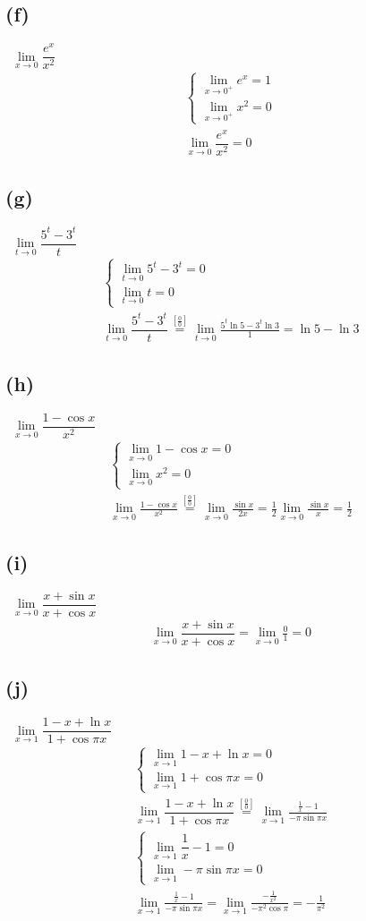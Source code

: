 \documentclass[12pt]{article}
\newcommand{\overfrac}[1]{\overset{[\frac{#1}{#1}]}{=}}
\newcommand{\subproblem}[1]{\subsection{(#1)} \,}
\begin{document}
\subproblem{f}
$\lim\limits_{x\to 0}\dfrac{e^x}{x^2}$
\begin{gather*}
    \begin{cases}
        \lim\limits_{x\to 0^+}e^x=1\\
        \lim\limits_{x\to 0^+}x^2=0
    \end{cases}\\
    \lim\limits_{x\to 0}\dfrac{e^x}{x^2}=\boxed{0}
\end{gather*}

\subproblem{g}
$\lim\limits_{t\to 0}\dfrac{5^t-3^t}{t}$
\begin{gather*}
    \begin{cases}
        \lim\limits_{t\to 0} 5^t-3^t=0\\
        \lim\limits_{t\to 0}t=0
    \end{cases}\\
    \lim\limits_{t\to 0}\dfrac{5^t-3^t}{t} \overset{[\frac{0}{0}]}{=}\lim\limits_{t\to 0}\frac{5^t\ln 5-3^t \ln 3}{1}=\boxed{\ln5-\ln 3}
\end{gather*}

\subproblem{h}
$\lim\limits_{x\to 0}\dfrac{1-\cos x}{x^2}$
\begin{gather*}
    \begin{cases}
        \lim\limits_{x\to 0}1-\cos x=0\\
        \lim\limits_{x\to 0}x^2=0
    \end{cases}\\
    \lim\limits_{x\to 0}\frac{1-\cos x}{x^2}\overfrac{0}\lim\limits_{x\to 0}\frac{\sin x}{2x}=\frac{1}{2}\lim\limits_{x\to 0}\frac{\sin x}{x}=\boxed{\frac{1}{2}}
\end{gather*}

\subproblem{i}
$\lim\limits_{x\to 0}\dfrac{x+\sin x}{x+\cos x}$
\begin{gather*}
    \lim\limits_{x\to 0}\dfrac{x+\sin x}{x+\cos x}=\lim\limits_{x\to 0}\frac{0}{1}=\boxed{0}
\end{gather*}

\subproblem{j}
$\lim\limits_{x\to 1}\dfrac{1-x+\ln x}{1+\cos \pi x}$
\begin{gather*}
    \begin{cases}
        \lim\limits_{x\to 1}1-x+\ln x=0\\
        \lim\limits_{x\to 1}1+\cos \pi x=0
    \end{cases}\\
    \lim\limits_{x\to 1}\dfrac{1-x+\ln x}{1+\cos \pi x}\overfrac{0}\lim\limits_{x\to 1}\frac{\frac{1}{x}-1}{-\pi \sin \pi x}\\
    \begin{cases}
        \lim\limits_{x\to 1}\dfrac{1}{x}-1=0\\
        \lim\limits_{x\to 1}-\pi \sin \pi x=0
    \end{cases}\\
    \lim\limits_{x\to 1}\frac{\frac{1}{x}-1}{-\pi \sin \pi x}=\lim\limits_{x\to 1}\frac{-\frac{1}{x^2}}{-\pi ^2 \cos \pi}=\boxed{-\frac{1}{\pi^2}}
\end{gather*}
\end{document}
